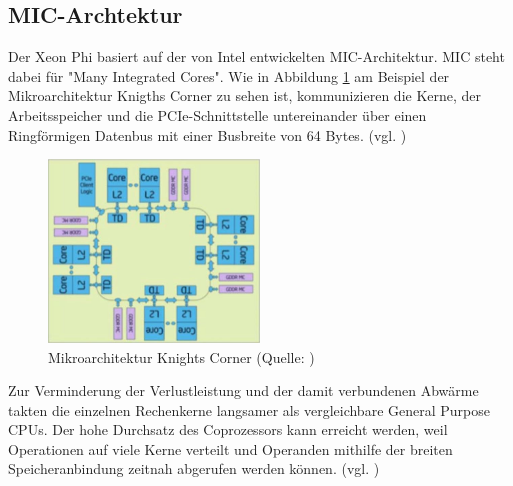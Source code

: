 \documentclass[../main.tex]{subfiles}
\begin{document}
\subsection{MIC-Archtektur}
Der Xeon Phi basiert auf der von Intel entwickelten MIC-Architektur. MIC steht dabei für "Many Integrated Cores". 
Wie in Abbildung \ref{pic:knightscorner} am Beispiel der Mikroarchitektur Knigths Corner zu sehen ist, kommunizieren die Kerne, der Arbeitsspeicher und die PCIe-Schnittstelle untereinander über einen Ringförmigen Datenbus mit einer Busbreite von 64 Bytes. (vgl. \cite{xeonphiJumpstart})
\begin{figure}
    \centering 
       \includegraphics[width=0.5\textwidth]{../images/Schmidt/intel_mic_diagram.jpg} 
    \caption {Mikroarchitektur Knights Corner (Quelle: \parencite{xeonphiJumpstart})}
    \label{pic:knightscorner} 
\end{figure}
Zur Verminderung der Verlustleistung und der damit verbundenen Abwärme takten die einzelnen Rechenkerne langsamer als vergleichbare General Purpose CPUs. Der hohe Durchsatz des Coprozessors kann erreicht werden, weil Operationen auf viele Kerne verteilt und Operanden mithilfe der breiten Speicheranbindung zeitnah abgerufen werden können. (vgl. \cite{xeonphiJumpstart})
\end{document}
